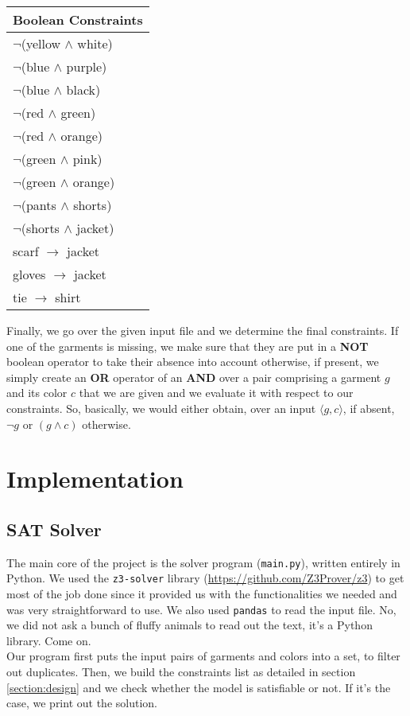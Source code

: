 \documentclass[12pt]{article}
\begin{document}
    \begin{center}
    \begin{tabular}{|l|}
    \hline
    Boolean Constraints \\
    \hline
    $\neg$(yellow $\wedge$ white) \\[0.1cm]
    $\neg$(blue $\wedge$ purple) \\[0.1cm]
    $\neg$(blue $\wedge$ black) \\[0.1cm]
    $\neg$(red $\wedge$ green) \\[0.1cm]
    $\neg$(red $\wedge$ orange) \\[0.1cm]
    $\neg$(green $\wedge$ pink) \\[0.1cm]
    $\neg$(green $\wedge$ orange) \\[0.1cm]
    $\neg$(pants $\wedge$ shorts) \\[0.1cm]
    $\neg$(shorts $\wedge$ jacket) \\[0.1cm]
    scarf $\rightarrow$ jacket \\[0.1cm]
    gloves $\rightarrow$ jacket \\[0.1cm]
    tie $\rightarrow$ shirt \\
    \hline
    \end{tabular}
    \end{center}

    Finally, we go over the given input file and we determine the final constraints. If one of the garments is missing, we make sure that they are put in a \textbf{NOT} boolean operator to take their absence into account otherwise, if present, we simply create an \textbf{OR} operator of an \textbf{AND} over a pair comprising a garment $g$ and its color $c$ that we are given and we evaluate it with respect to our constraints. So, basically, we would either obtain, over an input $\langle g, c \rangle$, if absent, $\neg g$ or $(g \wedge c)$ otherwise.


\section{Implementation}

    \subsection{SAT Solver}
        The main core of the project is the solver program (\texttt{main.py}), written entirely in Python. 
        We used the \texttt{z3-solver} library (\url{https://github.com/Z3Prover/z3}) to get most of the job done since it provided us with the functionalities
        we needed and was very straightforward to use. We also used \texttt{pandas} to read the input file. No, we did not ask a bunch of fluffy animals to read out the text, it's a Python library. Come on.\\
        Our program first puts the input pairs of garments and colors into a set, to filter out duplicates. Then, we build the constraints list as detailed in section \ref{section:design} and we check whether the model is
        satisfiable or not. If it's the case, we print out the solution.
\end{document}
